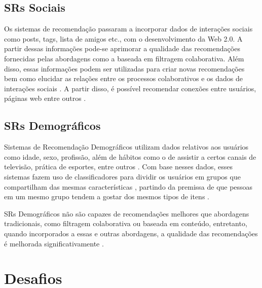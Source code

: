     \subsection{SRs Sociais}
    
    Os sistemas de recomendação passaram a incorporar dados de interações sociais como posts, tags, lista de amigos etc., com o desenvolvimento da Web 2.0. A partir dessas informações pode-se aprimorar a qualidade das recomendações fornecidas pelas abordagens como a baseada em filtragem colaborativa. Além disso, essas informações podem ser utilizadas para criar novas recomendações bem como elucidar as relações entre os processos colaborativos e os dados de interações sociais \cite{Bobadilla_2013}. A partir disso, é possível recomendar conexões entre usuários, páginas web entre outros \cite{Aggarwal2016}.
    
    
    \subsection{SRs Demográficos}
    
    Sistemas de Recomendação Demográficos utilizam dados relativos aos usuários como idade, sexo, profissão, além de hábitos como o de assistir a certos canais de televisão, prática de esportes, entre outros \cite{Krulwich1997}. Com base nesses dados, esses sistemas fazem uso de classificadores para dividir os usuários em grupos que compartilham das mesmas características \cite{Aggarwal2016}, partindo da premissa de que pessoas em um mesmo grupo tendem a gostar dos mesmos tipos de itens \cite{Pazzani1999}. 
   
    SRs Demográficos não são capazes de recomendações melhores que abordagens tradicionais, como filtragem colaborativa ou baseada em conteúdo, entretanto, quando incorporados a essas e outras abordagens, a qualidade das recomendações é melhorada significativamente \cite{Aggarwal2016}. 

    


\section{Desafios} \label{sec:desafios}

    
